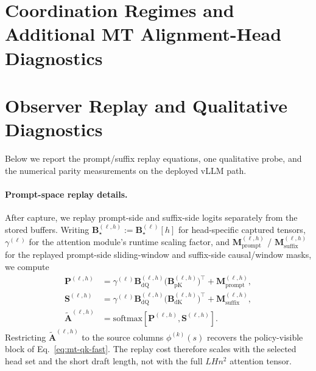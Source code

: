 \documentclass[11pt]{article}
\begin{document}
\section{Coordination Regimes and Additional MT Alignment-Head Diagnostics}
\label{sec:appendix-alignatt}







\section{Observer Replay and Qualitative Diagnostics}
\label{sec:appendix-observer}

Below we report the prompt/suffix replay equations, one qualitative probe, and
the numerical parity measurements on the deployed vLLM path.

\paragraph{Prompt-space replay details.}
After capture, we replay prompt-side and suffix-side logits separately from the
stored buffers. Writing $\mathbf{B}^{(\ell,h)}_\star :=
\mathbf{B}^{(\ell)}_\star[h]$ for head-specific captured tensors,
$\gamma^{(\ell)}$ for the attention module's runtime scaling factor, and
$\mathbf{M}^{(\ell,h)}_{\mathrm{prompt}}$ /
$\mathbf{M}^{(\ell,h)}_{\mathrm{suffix}}$ for the replayed prompt-side
sliding-window and suffix-side causal/window masks, we compute
\begin{align}
  \mathbf{P}^{(\ell,h)} &=
  \gamma^{(\ell)}
  \mathbf{B}^{(\ell,h)}_{\mathrm{dQ}}
  \bigl(\mathbf{B}^{(\ell,h)}_{\mathrm{pK}}\bigr)^{\!\top}
  + \mathbf{M}^{(\ell,h)}_{\mathrm{prompt}},
  \label{eq:prompt-logits}\\
  \mathbf{S}^{(\ell,h)} &=
  \gamma^{(\ell)}
  \mathbf{B}^{(\ell,h)}_{\mathrm{dQ}}
  \bigl(\mathbf{B}^{(\ell,h)}_{\mathrm{dK}}\bigr)^{\!\top}
  + \mathbf{M}^{(\ell,h)}_{\mathrm{suffix}},
  \label{eq:suffix-logits}\\
  \widetilde{\mathbf{A}}^{(\ell,h)}
  &= \mathrm{softmax}[\mathbf{P}^{(\ell,h)}, \mathbf{S}^{(\ell,h)}].
  \label{eq:vllm-softmax}
\end{align}
Restricting $\widetilde{\mathbf{A}}^{(\ell,h)}$ to the source columns
$\phi^{(k)}(s)$ recovers the policy-visible block of
Eq.~\eqref{eq:mt-qk-fast}. The replay cost therefore scales with the selected
head set and the short draft length, not with the full $LHn^2$ attention
tensor.
\end{document}
